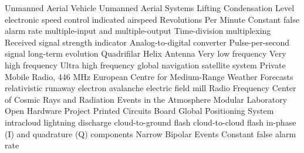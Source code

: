  {Unmanned Aerial Vehicle}
 {Unmanned Aerial Systems}
 {Lifting Condensation Level}
 {electronic speed control}
 {indicated airspeed}
 {Revolutions Per Minute}
 {Constant false alarm rate}
 {multiple-input and multiple-output}
 {Time-division multiplexing}
 {Received signal strength indicator}
 {Analog-to-digital converter}
 {Pulse-per-second signal}
 {long-term evolution}
 {Quadrifilar Helix Antenna}
 {Very low frequency}
 {Very high frequency}
 {Ultra high frequency}
 {global navigation satellite system}
 {Private Mobile Radio, 446 MHz}
 {European Centre for Medium-Range Weather Forecasts}
 {relativistic runaway electron avalanche}
 {electric field mill}
 {Radio Frequency}
 {Center of Cosmic Rays and Radiation Events in the Atmosphere}
 {Modular Laboratory Open Hardware Project}
 {Printed Circuits Board}
 {Global Positioning System}
 {intracloud lightning discharge}
 {cloud-to-ground flash}
 {cloud-to-cloud flash}
 {in-phase (I) and quadrature (Q) components}
 {Narrow Bipolar Events}
 {Constant false alarm rate}  


